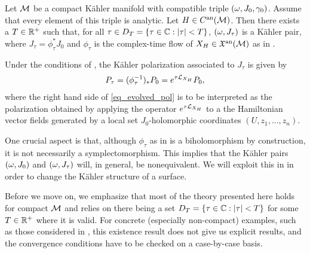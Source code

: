 \documentclass[notas.tex]{subfiles}
\begin{document}
\begin{thm} \label{thm_kpot_evolution}
	Let $\mathcal{M}$ be a compact Kähler manifold with compatible triple $(\omega, J_0, \gamma_0)$. Assume that every element of this triple is analytic. Let $H \in C^{\text{an}}(\mathcal{M})$. Then there exists a $T \in \mathbb{R}^+$ such that, for all $\tau \in D_T = \{\tau \in \mathbb{C} : \left|\tau\right| < T\}$, $(\omega, J_\tau)$ is a Kähler pair, where $J_\tau = \phi_\tau^* J_0$ and $\phi_\tau$ is the complex-time flow of $X_H \in \mathfrak{X}^{\text{an}}(\mathcal{M})$ as in .
\end{thm}

\begin{thm} \label{thm_polarization_evolution}
	Under the conditions of , the Kähler polarization associated to $J_\tau$ is given by
	\begin{align} \label{eq_evolved_pol}
		P_\tau = (\phi_\tau^{-1})_*P_0 = e^{\tau \mathcal{L}_{X_H}}P_0,
	\end{align}
	where the right hand side of \eqref{eq_evolved_pol} is to be interpreted as the polarization obtained by applying the operator $e^{\tau \mathcal{L}_{X_H}}$ to a the Hamiltonian vector fields generated by a local set $J_0$-holomorphic coordinates $(U,z_1,...,z_n)$.
\end{thm}

\begin{rem}\label{rem_geometry_evolution}
	One crucial aspect is that, although $\phi_\tau$ as in  is a biholomorphism by construction, it is not necessarily a symplectomorphism. This implies that the Kähler pairs $(\omega, J_0)$ and $(\omega, J_\tau)$ will, in general, be nonequivalent. We will exploit this in  in order to change the Kähler structure of a surface.
\end{rem}


Before we move on, we emphasize that most of the theory presented here holds for compact $\mathcal{M}$ and relies on there being a set $D_T=\{\tau \in \mathbb{C} : \left|\tau\right| < T\}$ for some $T \in \mathbb{R}^+$ where it is valid. For concrete (especially non-compact) examples, such as those considered in , this existence result does not give us explicit results, and the convergence conditions have to be checked on a case-by-case basis. \\
\end{document}
